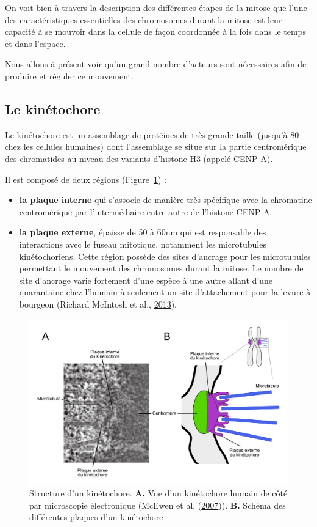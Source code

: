 \documentclass[12pt,a4paper,twoside,openright]{book}
\begin{document}
On voit bien à travers la description des différentes étapes de la
mitose que l'une des caractéristiques essentielles des chromosomes
durant la mitose est leur capacité à se mouvoir dans la cellule de façon
coordonnée à la fois dans le temps et dans l'espace.

Nous allons à présent voir qu'un grand nombre d'acteurs sont nécessaires
afin de produire et réguler ce mouvement.

\subsection{Le kinétochore}\label{le-kinuxe9tochore}

Le kinétochore est un assemblage de protéines de très grande taille
(jusqu'à 80 chez les cellules humaines) dont l'assemblage se situe sur
la partie centromérique des chromatides au niveau des variants d'histone
H3 (appelé CENP-A).

Il est composé de deux régions (Figure~\ref{fig:kt}) :

\begin{itemize}
\item
  \textbf{la plaque interne} qui s'associe de manière très spécifique
  avec la chromatine centromérique par l'intermédiaire entre autre de
  l'histone CENP-A.
\item
  \textbf{la plaque externe}, épaisse de 50 à 60nm qui est responsable
  des interactions avec le fuseau mitotique, notamment les microtubules
  kinétochoriens. Cette région possède des sites d'ancrage pour les
  microtubules permettant le mouvement des chromosomes durant la mitose.
  Le nombre de site d'ancrage varie fortement d'une espèce à une autre
  allant d'une quarantaine chez l'humain à seulement un site
  d'attachement pour la levure à bourgeon (Richard McIntosh et al.,
  \protect\hyperlink{ref-Mcintosh2013}{2013}).
\end{itemize}

\begin{figure}[htbp]
\centering
\includegraphics{figures/intro/kt.png}
\caption[Structure d'un kinétochore]{\label{fig:kt}Structure d'un
kinétochore. \textbf{A.} Vue d'un kinétochore humain de côté par
microscopie électronique (McEwen et al.
(\protect\hyperlink{ref-McEwen2007}{2007})). \textbf{B.} Schéma des
différentes plaques d'un kinétochore}
\end{figure}
\end{document}

